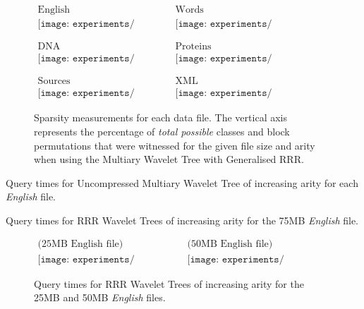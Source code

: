 \begin{figure}[h]
\begin{center}
$\begin{array}{cc}
\mbox{English} & \mbox{Words} \\
\texttt{[image: experiments/sparse\_english]} &
\texttt{[image: experiments/sparse\_english\_ints]} \\ \\ \\
\mbox{DNA} & \mbox{Proteins} \\ 
\texttt{[image: experiments/sparse\_dna]} &
\texttt{[image: experiments/sparse\_proteins]} \\ \\ \\
\mbox{Sources} & \mbox{XML} \\
\texttt{[image: experiments/sparse\_sources]} &
\texttt{[image: experiments/sparse\_dblp\_xml]}
\end{array}$
\end{center}
\caption{Sparsity measurements for each data file. The vertical axis represents
the percentage of \emph{total possible} classes and block permutations that were
witnessed for the given file size and arity when using the 
Multiary Wavelet Tree with Generalised RRR.}
\label{fig:sparse}
\end{figure}

\clearpage
			{Query times for Uncompressed Multiary Wavelet Tree of increasing 
			arity for each \emph{English} file.}
		
			{Query times for RRR Wavelet Trees of increasing arity
			for the 75MB \emph{English} file.}
	
			\begin{figure}[h]
			\begin{center}
			$\begin{array}{cc}
			\mbox{(25MB English file)} & 
			\mbox{(50MB English file)} \\
			\texttt{[image: experiments/time\_english\_25MB]} &
			\texttt{[image: experiments/time\_english\_50MB]}
			\end{array}$
			\end{center}
			\caption{Query times for RRR Wavelet Trees of increasing arity
			for the 25MB and 50MB \emph{English} files.}
			\label{fig:time-eng-25-50}
			\end{figure}
			
